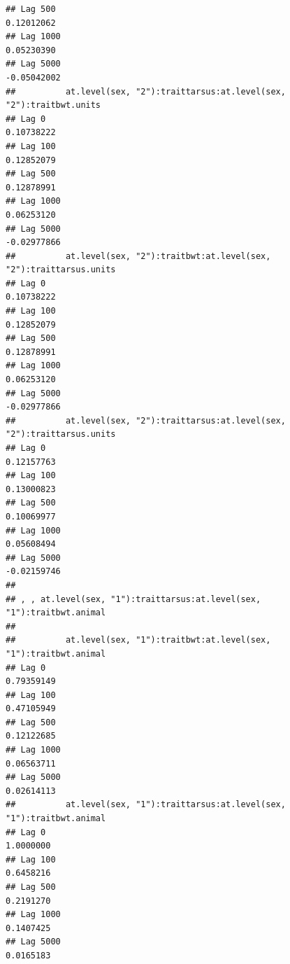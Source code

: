 \documentclass[
  12pt,
]{book}
\begin{document}
\begin{verbatim}
## Lag 500                                                     0.12012062
## Lag 1000                                                    0.05230390
## Lag 5000                                                   -0.05042002
##          at.level(sex, "2"):traittarsus:at.level(sex, "2"):traitbwt.units
## Lag 0                                                          0.10738222
## Lag 100                                                        0.12852079
## Lag 500                                                        0.12878991
## Lag 1000                                                       0.06253120
## Lag 5000                                                      -0.02977866
##          at.level(sex, "2"):traitbwt:at.level(sex, "2"):traittarsus.units
## Lag 0                                                          0.10738222
## Lag 100                                                        0.12852079
## Lag 500                                                        0.12878991
## Lag 1000                                                       0.06253120
## Lag 5000                                                      -0.02977866
##          at.level(sex, "2"):traittarsus:at.level(sex, "2"):traittarsus.units
## Lag 0                                                             0.12157763
## Lag 100                                                           0.13000823
## Lag 500                                                           0.10069977
## Lag 1000                                                          0.05608494
## Lag 5000                                                         -0.02159746
## 
## , , at.level(sex, "1"):traittarsus:at.level(sex, "1"):traitbwt.animal
## 
##          at.level(sex, "1"):traitbwt:at.level(sex, "1"):traitbwt.animal
## Lag 0                                                        0.79359149
## Lag 100                                                      0.47105949
## Lag 500                                                      0.12122685
## Lag 1000                                                     0.06563711
## Lag 5000                                                     0.02614113
##          at.level(sex, "1"):traittarsus:at.level(sex, "1"):traitbwt.animal
## Lag 0                                                            1.0000000
## Lag 100                                                          0.6458216
## Lag 500                                                          0.2191270
## Lag 1000                                                         0.1407425
## Lag 5000                                                         0.0165183

\end{verbatim}
\end{document}
